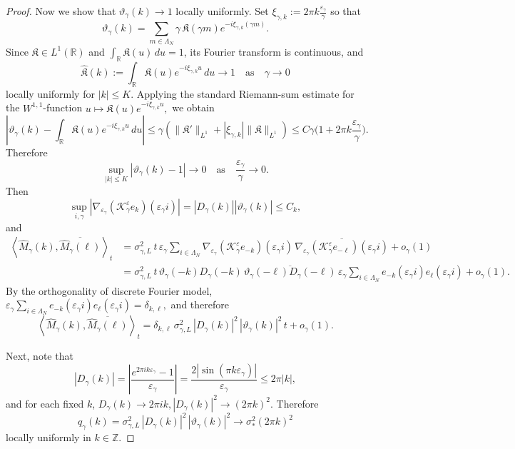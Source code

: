 \documentclass{article}
\begin{document}
\begin{proof}
Now we show that \(\vartheta_\gamma(k)\to1\) locally uniformly.
Set $\xi_{\gamma,k}:=2\pi k\frac{\varepsilon_\gamma}{\gamma}$ so that
\[
\vartheta_\gamma(k)
=
\sum_{m\in\Lambda_N}\gamma\,\mathfrak K(\gamma m)e^{-i\xi_{\gamma,k}(\gamma m)}.
\]
Since \(\mathfrak K\in L^1(\mathbb R)\) and $\int_{\mathbb R}\mathfrak K(u)\,du=1$, its Fourier transform is continuous, and
\[
\widehat{\mathfrak K}(k) := \int_{\mathbb R}\mathfrak K(u)e^{-i\xi_{\gamma,k}u}\,du \rightarrow1 \quad \text{as} \quad \gamma \to 0
\]
locally uniformly for \(|k|\le K\). 
Applying the standard Riemann-sum estimate for the \(W^{1,1}\)-function
\(
u\mapsto \mathfrak K(u)e^{-i\xi_{\gamma,k}u},
\)
we obtain
\[
\left|
\vartheta_\gamma(k)-\int_{\mathbb R}\mathfrak K(u)e^{-i\xi_{\gamma,k}u}\,du
\right|
\leq \gamma(\|\mathfrak K' \|_{L^1} + |\xi_{\gamma,k}|\|\mathfrak K\|_{L^1}) \le
C\gamma\bigl(1+2\pi k \frac{\varepsilon_\gamma}{\gamma} \bigr).
\]
Therefore
\[
\sup_{|k|\le K}
\left|
\vartheta_\gamma(k)- 1
\right|
\rightarrow 0 \quad \text{as} \quad \frac{\varepsilon_{\gamma}}{\gamma} \to 0.
\]
Then 
\begin{equation}\label{E:jumpc}
    \sup_{i,\gamma}|\nabla_{\varepsilon_\gamma}(\mathcal K_\gamma^\varepsilon e_k)(\varepsilon_\gamma i)| =  |D_\gamma(k)||\vartheta_\gamma(k)| \leq C_k,
\end{equation}
and 
\begin{align*}
\left\langle \widehat M_\gamma(k),\overline{\widehat M_\gamma(\ell)}\right\rangle_t
&=
\sigma_{\gamma,L}^2\,t\,
\varepsilon_\gamma\sum_{i\in\Lambda_N}
\nabla_{\varepsilon_\gamma}(\mathcal K_\gamma^\varepsilon e_{-k})(\varepsilon_\gamma i)\,
\overline{\nabla_{\varepsilon_\gamma}(\mathcal K_\gamma^\varepsilon e_{-\ell})(\varepsilon_\gamma i)}
+
o_\gamma(1) \\
&=
\sigma_{\gamma,L}^2\,t\,
\vartheta_\gamma(-k)D_\gamma(-k)\,
\overline{\vartheta_\gamma(-\ell)D_\gamma(-\ell)}
\,
\varepsilon_\gamma\sum_{i\in\Lambda_N}e_{-k}(\varepsilon_\gamma i)e_{\ell}(\varepsilon_\gamma i)
+
o_\gamma(1).
\end{align*}
By the orthogonality of discrete Fourier model,
\(
\varepsilon_\gamma\sum_{i\in\Lambda_N}e_{-k}(\varepsilon_\gamma i)e_{\ell}(\varepsilon_\gamma i)
=
\delta_{k,\ell},
\)
and therefore
\[
\left\langle \widehat M_\gamma(k),\overline{\widehat M_\gamma(\ell)}\right\rangle_t
=
\delta_{k,\ell}\,
\sigma_{\gamma,L}^2\,|D_\gamma(k)|^2\,|\vartheta_\gamma(k)|^2\,t
+
o_\gamma(1).
\]

Next, note that
\[
|D_\gamma(k)|
=
\left|\frac{e^{2\pi i k\varepsilon_\gamma}-1}{\varepsilon_\gamma}\right|
=
\frac{2|\sin(\pi k\varepsilon_\gamma)|}{\varepsilon_\gamma}
\le 2\pi |k|,
\]
and for each fixed \(k\),
\(
D_\gamma(k)\longrightarrow 2\pi i k, 
|D_\gamma(k)|^2\longrightarrow (2\pi k)^2.
\)
Therefore
\[
q_\gamma(k)
=
\sigma_{\gamma,L}^2\,|D_\gamma(k)|^2\,|\vartheta_\gamma(k)|^2
\longrightarrow
\sigma_*^2(2\pi k)^2
\]
locally uniformly in \(k\in\mathbb Z\).


\end{proof}
\end{document}
